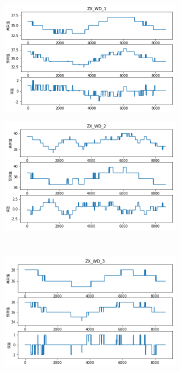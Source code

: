\begin{figure}[H]
\centering
\begin{subfigure}[t]{0.48\textwidth}
    \centering
    \includegraphics[scale=0.45]{figures/sr/deap-zw_wd_1.png}
\end{subfigure}\hfill
\begin{subfigure}[t]{0.48\textwidth}
    \centering
    \includegraphics[scale=0.45]{figures/sr/deap-zw_wd_2.png}
\end{subfigure}\\
\begin{subfigure}[t]{0.48\textwidth}
  \centering
  \includegraphics[scale=0.45]{figures/sr/deap-zw_wd_3.png}

\end{subfigure}
\end{figure}
